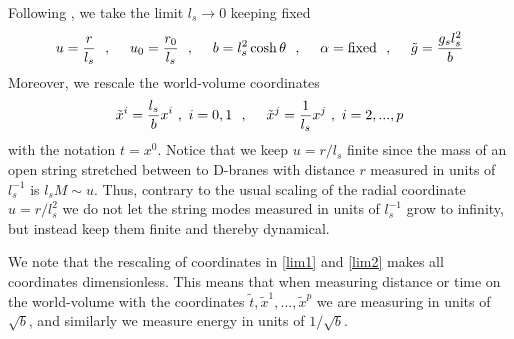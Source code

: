 \documentclass[a4paper,twoside,titlepage,12pt]{article}
\begin{document}
Following \cite{Gopakumar:2000na}, 
we take the limit \( l_s \rightarrow 0 \) keeping fixed
%
\begin{equation}
\label{lim1}
u = \frac{r}{l_s} \ \ ,\ \ \ \ 
u_0 = \frac{r_0}{l_s} \ \ ,\ \ \ \ 
b = l_s^2 \cosh \theta \ \ ,\ \ \ \ 
\alpha = \mbox{fixed} \ \ ,\ \ \ \ 
\tilde{g} = \frac{g_s l_s^2}{b}
\end{equation}
%
Moreover, we rescale the world-volume coordinates
%
\begin{equation}
\label{lim2}
\tilde{x}^i = \frac{l_s}{b} x^i\ , \ i=0,1 \ \ ,\ \ \ \ 
\tilde{x}^j = \frac{1}{l_s} x^j\ , \ i=2,...,p
\end{equation}
%
with the notation \( t = x^0 \).
Notice that we keep \( u = r / l_s \) finite since the mass of an
open string stretched between to D-branes with distance $r$
measured in units of \( l_s^{-1} \) is \( l_s M \sim u \). 
Thus, contrary to the usual scaling of the radial
coordinate \( u = r /l_s^2 \) we do not let the string modes measured in
units of \( l_s^{-1} \) grow to infinity, but instead keep them finite
and thereby dynamical.

We note that the rescaling of coordinates in \eqref{lim1} and \eqref{lim2} 
makes all coordinates dimensionless. This means that when measuring
distance or time on the world-volume with the coordinates
\( \tilde{t},\tilde{x}^1,...,\tilde{x}^p \) 
we are measuring in units of \( \sqrt{b} \), and similarly we
measure energy in units of \( 1/ \sqrt{b} \).
\end{document}
